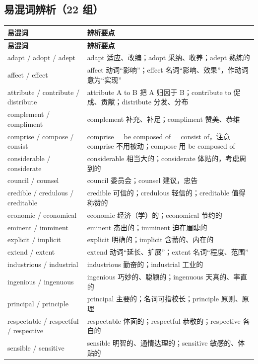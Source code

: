 \subsection{易混词辨析（22 组）}

\begin{center}
\small
\begin{longtable}{p{4.3cm}p{10.5cm}}
\toprule
\textbf{易混词} & \textbf{辨析要点} \\
\midrule
\endfirsthead
\toprule
\textbf{易混词} & \textbf{辨析要点} \\
\midrule
\endhead
adapt / adopt / adept & adapt 适应、改编；adopt 采纳、收养；adept 熟练的 \\
affect / effect & affect 动词“影响”；effect 名词“影响、效果”，作动词意为“实现” \\
attribute / contribute / distribute & attribute A to B 把 A 归因于 B；contribute to 促成、贡献；distribute 分发、分布 \\
complement / compliment & complement 补充、补足；compliment 赞美、恭维 \\
comprise / compose / consist & comprise = be composed of = consist of，注意 comprise 不用被动；compose 用 be composed of \\
considerable / considerate & considerable 相当大的；considerate 体贴的，考虑周到的 \\
council / counsel & council 委员会；counsel 建议，忠告 \\
credible / credulous / creditable & credible 可信的；credulous 轻信的；creditable 值得称赞的 \\
economic / economical & economic 经济（学）的；economical 节约的 \\
eminent / imminent & eminent 杰出的；imminent 迫在眉睫的 \\
explicit / implicit & explicit 明确的；implicit 含蓄的、内在的 \\
extend / extent & extend 动词“延长、扩展”；extent 名词“程度、范围” \\
industrious / industrial & industrious 勤奋的；industrial 工业的 \\
ingenious / ingenuous & ingenious 巧妙的、聪颖的；ingenuous 天真的、率直的 \\
principal / principle & principal 主要的；名词可指校长；principle 原则、原理 \\
respectable / respectful / respective & respectable 体面的；respectful 恭敬的；respective 各自的 \\
sensible / sensitive & sensible 明智的、通情达理的；sensitive 敏感的、体贴的 \\

\end{longtable}
\end{center}
